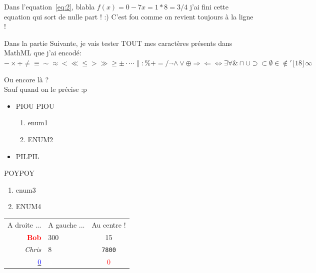 \documentclass[10pt,a4paper]{report}
\begin{document}
Dans l'equation~\eqref{eq:2}, blabla \(f(x) = 0 -7x = 1 * 8 = 3 /4 \) j'ai fini cette equation qui sort de nulle part ! :)  C'est fou comme on revient toujours à la ligne !

Dans la partie Suivante, je vais tester TOUT mes caractères présents dans MathML que j'ai encodé: \( - \times \div \neq \equiv \sim \approx < \ll \leq > \gg \geq \pm \cdot \cdots \| : \% + = /
 \neg \wedge \vee \oplus \Rightarrow \Leftarrow \Leftrightarrow \exists \forall \&
\cap \cup \supset \subset \emptyset \in \notin
\prime \lfloor 18 \rfloor \infty
\)

Ou encore là ? \\Sauf quand on le précise :p

\begin{itemize}
\item PIOU PIOU
\begin{enumerate}
\item enum1
\item ENUM2
\end{enumerate}
\item PILPIL
\end{itemize}

POYPOY
\begin{enumerate}
\item enum3
\item ENUM4
\end{enumerate}
\begin{tabular}{rlc}
A droite ... & A gauche ... & Au centre ! \\
{\bf \textcolor{red}{Bob}} & 300 & 15 \\
{\itshape Chris} & 8 & \texttt{7800} \\
\underline{ \textcolor{blue}{0}} & \textcolor{white}{h} & \textcolor{red}{0} \\
\end{tabular}
\end{document}
